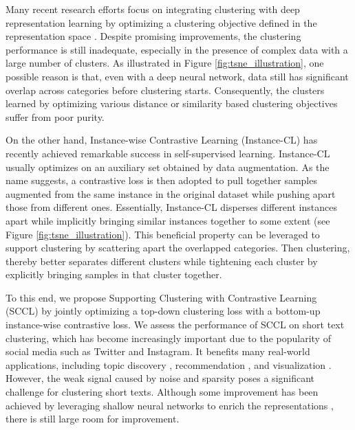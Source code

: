\documentclass[11pt]{article}
\begin{document}
Many recent research efforts focus on integrating clustering with deep representation learning by optimizing a clustering objective defined in the representation space \citep{xie2016unsupervised,jiang2016variational,zhang2017deep,shaham2018spectralnet}. 
Despite promising improvements, the clustering performance is still inadequate, 
especially in the presence of complex data with a large number of clusters. As illustrated in Figure \ref{fig:tsne_illustration}, one possible reason is that, even with a deep neural network, data still has significant overlap across categories before clustering starts. Consequently, the clusters learned by optimizing various distance or similarity based clustering objectives suffer from poor purity.


On the other hand, Instance-wise Contrastive Learning (Instance-CL)  \citep{wu2018unsupervised,bachman2019learning, he2020momentum, chen2020simple, xchen2020improved} has recently achieved remarkable success in self-supervised learning. Instance-CL usually optimizes on an auxiliary set obtained by data augmentation. As the name suggests,  a contrastive loss is then adopted to pull together samples augmented from the same instance in the original dataset while pushing apart those from different ones. Essentially, Instance-CL disperses different instances apart while implicitly bringing similar instances together to some extent (see Figure \ref{fig:tsne_illustration}). This beneficial property can be leveraged to support clustering by scattering apart the overlapped categories.
Then clustering, thereby better separates different clusters while tightening each cluster by explicitly bringing samples in that cluster together.

To this end, we propose Supporting Clustering with Contrastive Learning (SCCL) by jointly optimizing a top-down clustering loss with a bottom-up instance-wise contrastive loss. 
We assess the performance of SCCL on short text clustering, which has become increasingly important due to the popularity of social media such as Twitter and Instagram. It benefits many real-world applications, including topic discovery \citep{kim2013discovering},  recommendation \citep{bouras2017improving}, and visualization \citep{sebrechts1999visualization}. However, the weak signal caused by noise and sparsity poses a significant challenge for clustering short texts. Although some improvement has been achieved by leveraging shallow neural networks to enrich the representations \citep{xu2017self, hadifar2019self}, there is still large room for improvement.
\end{document}
